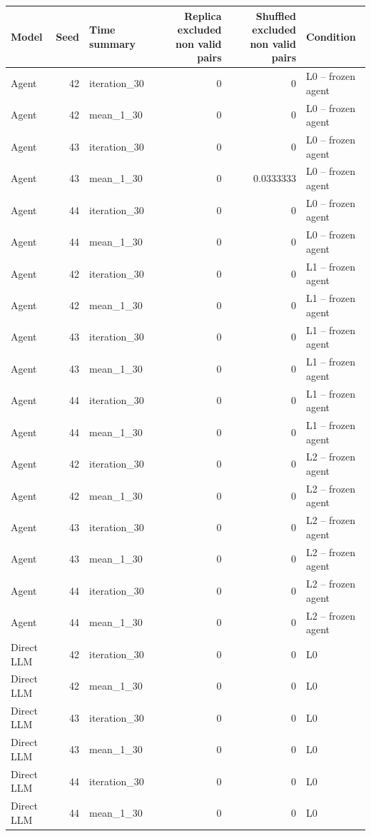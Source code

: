 \begin{table}[htbp!]
\centering
\small
\setlength{\tabcolsep}{3pt}
\renewcommand{\arraystretch}{1.1}
\begin{tabular}{lrlrrl}
\hline
Model & Seed & Time summary & Replica excluded non valid pairs & Shuffled excluded non valid pairs & Condition \\
\hline
Agent & 42 & iteration\_30 & 0 & 0 & L0 -- frozen agent \\
Agent & 42 & mean\_1\_30 & 0 & 0 & L0 -- frozen agent \\
Agent & 43 & iteration\_30 & 0 & 0 & L0 -- frozen agent \\
Agent & 43 & mean\_1\_30 & 0 & 0.0333333 & L0 -- frozen agent \\
Agent & 44 & iteration\_30 & 0 & 0 & L0 -- frozen agent \\
Agent & 44 & mean\_1\_30 & 0 & 0 & L0 -- frozen agent \\
Agent & 42 & iteration\_30 & 0 & 0 & L1 -- frozen agent \\
Agent & 42 & mean\_1\_30 & 0 & 0 & L1 -- frozen agent \\
Agent & 43 & iteration\_30 & 0 & 0 & L1 -- frozen agent \\
Agent & 43 & mean\_1\_30 & 0 & 0 & L1 -- frozen agent \\
Agent & 44 & iteration\_30 & 0 & 0 & L1 -- frozen agent \\
Agent & 44 & mean\_1\_30 & 0 & 0 & L1 -- frozen agent \\
Agent & 42 & iteration\_30 & 0 & 0 & L2 -- frozen agent \\
Agent & 42 & mean\_1\_30 & 0 & 0 & L2 -- frozen agent \\
Agent & 43 & iteration\_30 & 0 & 0 & L2 -- frozen agent \\
Agent & 43 & mean\_1\_30 & 0 & 0 & L2 -- frozen agent \\
Agent & 44 & iteration\_30 & 0 & 0 & L2 -- frozen agent \\
Agent & 44 & mean\_1\_30 & 0 & 0 & L2 -- frozen agent \\
Direct LLM & 42 & iteration\_30 & 0 & 0 & L0 \\
Direct LLM & 42 & mean\_1\_30 & 0 & 0 & L0 \\
Direct LLM & 43 & iteration\_30 & 0 & 0 & L0 \\
Direct LLM & 43 & mean\_1\_30 & 0 & 0 & L0 \\
Direct LLM & 44 & iteration\_30 & 0 & 0 & L0 \\
Direct LLM & 44 & mean\_1\_30 & 0 & 0 & L0 \\

\end{tabular}
\end{table}
